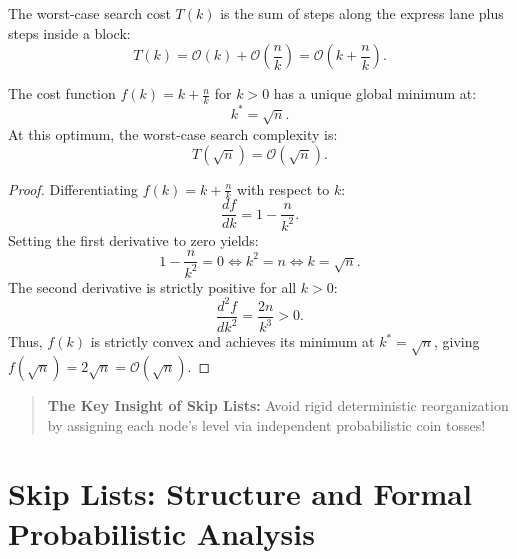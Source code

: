 The worst-case search cost $T(k)$ is the sum of steps along the express lane plus steps inside a block:
\begin{equation}
  T(k) = \mathcal{O}(k) + \mathcal{O}\left(\frac{n}{k}\right) = \mathcal{O}\left(k + \frac{n}{k}\right).
\end{equation}

\begin{theorem}
The cost function $f(k) = k + \frac{n}{k}$ for $k > 0$ has a unique global minimum at:
\begin{equation}
  k^* = \sqrt{n}.
\end{equation}
At this optimum, the worst-case search complexity is:
\begin{equation}
  T(\sqrt{n}) = \mathcal{O}(\sqrt{n}).
\end{equation}
\end{theorem}

\begin{proof}
Differentiating $f(k) = k + \frac{n}{k}$ with respect to $k$:
\begin{equation}
  \frac{df}{dk} = 1 - \frac{n}{k^2}.
\end{equation}
Setting the first derivative to zero yields:
\begin{equation}
  1 - \frac{n}{k^2} = 0 \iff k^2 = n \iff k = \sqrt{n}.
\end{equation}
The second derivative is strictly positive for all $k > 0$:
\begin{equation}
  \frac{d^2f}{dk^2} = \frac{2n}{k^3} > 0.
\end{equation}
Thus, $f(k)$ is strictly convex and achieves its minimum at $k^* = \sqrt{n}$, giving $f(\sqrt{n}) = 2\sqrt{n} = \mathcal{O}(\sqrt{n})$.
\end{proof}

\begin{quote}
  \textbf{The Key Insight of Skip Lists:} Avoid rigid deterministic reorganization by assigning each node's level via independent probabilistic coin tosses!
\end{quote}

\FloatBarrier
\section{Skip Lists: Structure and Formal Probabilistic Analysis}
\label{sec:skip-list-probabilistic-analysis}

